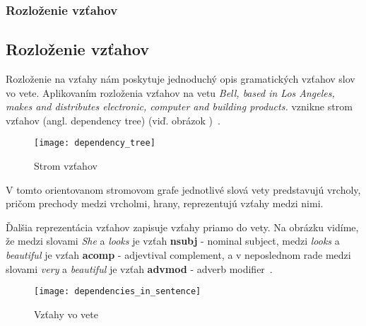 %
%
{
	\subsubsection{Rozloženie vzťahov}
}
{
	\subsection{Rozloženie vzťahov}
}
\label{subsubsec:dependencyparsing}
Rozloženie na vzťahy nám poskytuje jednoduchý opis gramatických vzťahov slov vo vete. Aplikovaním rozloženia vzťahov na vetu \textit{Bell, based in Los
Angeles, makes and distributes electronic, computer and building products.
} vznikne strom vzťahov (angl. dependency tree) (viď. obrázok )~\cite{StanfordDepManual}.

\begin{figure}[H]
\begin{center}\texttt{[image: dependency\_tree]}\end{center}
\caption[Strom vzťahov]{Strom vzťahov}\label{fig:dependency_tree}
\end{figure}

V tomto orientovanom stromovom grafe jednotlivé slová vety predstavujú vrcholy, pričom prechody medzi vrcholmi, hrany, reprezentujú vzťahy medzi nimi.

Ďalšia reprezentácia vzťahov zapisuje vzťahy priamo do vety. Na obrázku  vidíme, že medzi slovami \textit{She} a \textit{looks} je vzťah \textbf{nsubj} - nominal subject, medzi \textit{looks} a \textit{beautiful} je vzťah \textbf{acomp} - adjevtival complement, a v neposlednom rade medzi slovami \textit{very} a \textit{beautiful} je vzťah \textbf{advmod} - adverb modifier~\cite{StanfordDepManual}.

\begin{figure}[H]
\begin{center}\texttt{[image: dependencies\_in\_sentence]}\end{center}
\caption[Vzťahy vo vete]{Vzťahy vo vete}\label{fig:dependencies_in_sentence}
\end{figure}

